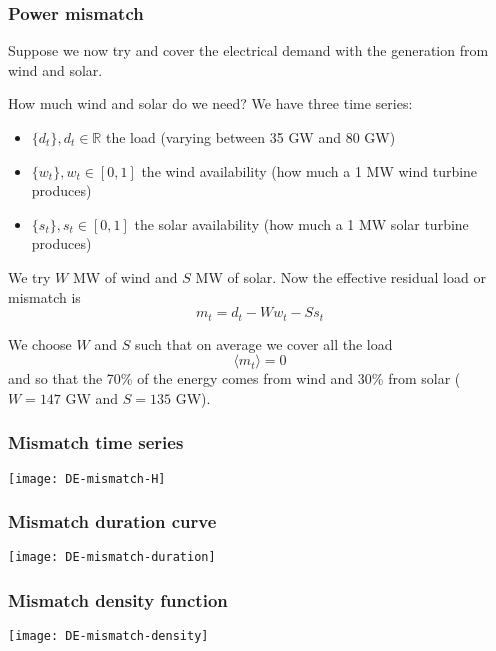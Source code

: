 \documentclass[10pt,aspectratio=169,dvipsnames]{beamer}
\newcommand{\R}{\mathbb{R}}
\let\olditem\item
\renewcommand{\item}{%
\olditem\vspace{5pt}}
\begin{document}
\begin{frame}
  \frametitle{Power mismatch}

  Suppose we now try and cover the electrical demand with the
  generation from wind and solar.

  How much wind and solar do we need? We have three time series:
  \begin{itemize}
  \item $\{ d_t\}, d_t \in \R$ the load (varying between 35 GW and 80 GW)
  \item $\{ w_t\}, w_t \in [0,1]$ the wind availability (how much a 1 MW wind turbine produces)
  \item $\{ s_t\}, s_t \in [0,1]$ the solar availability  (how much a 1 MW solar turbine produces)
  \end{itemize}

  We try $W$ MW of wind and $S$ MW of solar. Now the effective \alert{residual load} or \alert{mismatch} is
  \begin{equation*}
    m_t = d_t - Ww_t - Ss_t
  \end{equation*}

  We choose $W$ and $S$ such that on \alert{average} we cover all the load
  \begin{equation*}
    \langle m_t \rangle = 0
  \end{equation*}
  and so that the 70\% of the energy comes from wind and 30\% from solar ($W = 147$ GW and $S = 135$ GW).

\end{frame}




\begin{frame}
  \frametitle{Mismatch time series}


  \centering
  \texttt{[image: DE-mismatch-H]}

\end{frame}



\begin{frame}
  \frametitle{Mismatch duration curve}



  \centering
  \texttt{[image: DE-mismatch-duration]}

\end{frame}




\begin{frame}
  \frametitle{Mismatch density function}

  \centering
  \texttt{[image: DE-mismatch-density]}

\end{frame}
\end{document}
